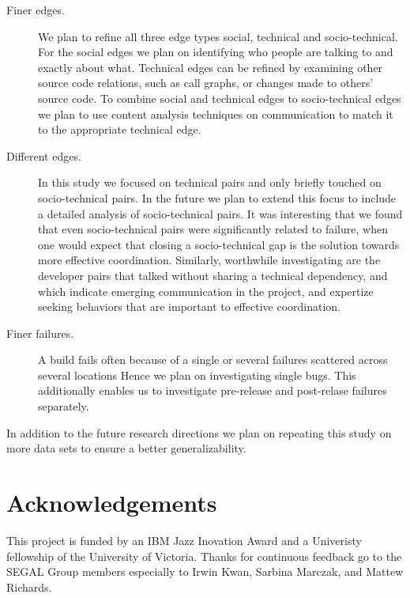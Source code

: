 \documentclass{sig-alternate}
\begin{document}
\begin{description}
\item[Finer edges.]
We plan to refine all three edge types social, technical and socio-technical.
For the social edges we plan on identifying who people are talking to and exactly about what.
Technical edges can be refined by examining other source code relations, such as call graphs, or changes made to others' source code.
To combine social and technical edges to socio-technical edges we plan to use content analysis techniques on communication to match it to the appropriate technical edge.
\item[Different edges.]
In this study we focused on technical pairs and only briefly touched on
socio-technical pairs. In the future we plan to extend this focus to include a
detailed analysis of socio-technical pairs. It was interesting that we found
that even socio-technical pairs were significantly related to failure, when one
would expect that closing a socio-technical gap is the solution towards more
effective coordination. Similarly, worthwhile investigating are the
developer pairs that talked without sharing a technical dependency, and which
indicate emerging communication in the project, and expertize seeking
behaviors that are important to effective coordination.
\item[Finer failures.]
A build fails often because of a single or several failures scattered across several locations
Hence we plan on
investigating single bugs. This additionally enables us to investigate pre-release and post-relase failures separately.
\end{description}

In addition to the future research directions we plan on repeating this study on more data sets to ensure a better generalizability.

\section{Acknowledgements}
This project is funded by an IBM Jazz Inovation Award and a Univeristy fellowship of the University of Victoria.
Thanks for continuous feedback go to the SEGAL Group members especially to Irwin
Kwan, Sarbina Marczak, and Mattew Richards.

%

%
%

\end{document}
